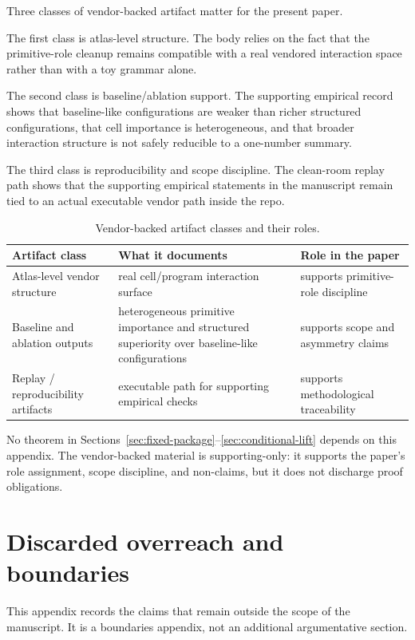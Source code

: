 \documentclass[11pt]{article}
\begin{document}
Three classes of vendor-backed artifact matter for the present paper.

The first class is atlas-level structure. The body relies on the fact that the primitive-role cleanup remains compatible with a real vendored interaction space rather than with a toy grammar alone.

The second class is baseline/ablation support. The supporting empirical record shows that baseline-like configurations are weaker than richer structured configurations, that cell importance is heterogeneous, and that broader interaction structure is not safely reducible to a one-number summary.

The third class is reproducibility and scope discipline. The clean-room replay path shows that the supporting empirical statements in the manuscript remain tied to an actual executable vendor path inside the repo.

\begin{table}[h]
\caption{Vendor-backed artifact classes and their roles.}
\label{tab:vendor-artifacts}
\centering
\small
\begin{tabularx}{\textwidth}{@{}l X X@{}}
\toprule
Artifact class & What it documents & Role in the paper \\
\midrule
Atlas-level vendor structure & real cell/program interaction surface & supports primitive-role discipline \\[4pt]
Baseline and ablation outputs & heterogeneous primitive importance and structured superiority over baseline-like configurations & supports scope and asymmetry claims \\[4pt]
Replay / reproducibility artifacts & executable path for supporting empirical checks & supports methodological traceability \\
\bottomrule
\end{tabularx}
\end{table}

No theorem in Sections~\ref{sec:fixed-package}--\ref{sec:conditional-lift} depends on this appendix. The vendor-backed material is supporting-only: it supports the paper's role assignment, scope discipline, and non-claims, but it does not discharge proof obligations.
 \section{Discarded overreach and boundaries}\label{app:boundaries}

This appendix records the claims that remain outside the scope of the manuscript. It is a boundaries appendix, not an additional argumentative section.
\end{document}
